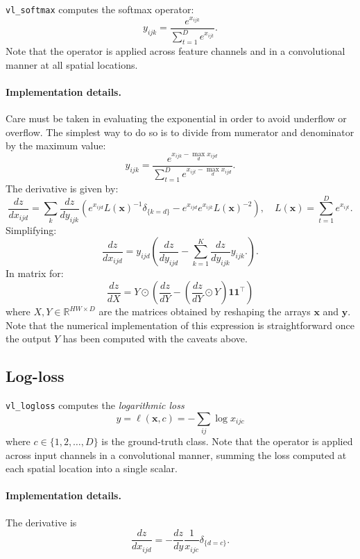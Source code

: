 \documentclass[12pt]{article}
\newcommand{\real}{\mathbb{R}}
\newcommand{\bx}{\mathbf{x}}
\newcommand{\by}{\mathbf{y}}
\newcommand{\bone}{\mathbf{1}}
\begin{document}
\verb!vl_softmax! computes the softmax operator:
\[
 y_{ijk} = \frac{e^{x_{ijk}}}{\sum_{t=1}^D e^{x_{ijt}}}.
\]
Note that the operator is applied across feature channels and in a convolutional manner at all spatial locations.

\paragraph{Implementation details.} Care must be taken in evaluating the exponential in order to avoid underflow or overflow. The simplest way to do so is to divide from numerator and denominator by the maximum value:
\[
 y_{ijk} = \frac{e^{x_{ijk} - \max_d x_{ijd}}}{\sum_{t=1}^D e^{x_{ijt}- \max_d x_{ijd}}}.
\]
The derivative is given by:
\[
\frac{dz}{d x_{ijd}}
=
\sum_{k}
\frac{dz}{d y_{ijk}}
\left(
e^{x_{ijd}} L(\bx)^{-1} \delta_{\{k=d\}}
-
e^{x_{ijd}}
e^{x_{ijk}} L(\bx)^{-2}
\right),
\quad
L(\bx) = \sum_{t=1}^D e^{x_{ijt}}.
\]
Simplifying:
\[
\frac{dz}{d x_{ijd}}
=
y_{ijd} 
\left(
\frac{dz}{d y_{ijd}}
-
\sum_{k=1}^K
\frac{dz}{d y_{ijk}} y_{ijk}.
\right).
\]
In matrix for:
\[
  \frac{dz}{dX} = Y \odot \left(\frac{dz}{dY} 
  - \left(\frac{dz}{dY} \odot Y\right) \bone\bone^\top\right)
\]
where $X,Y\in\real^{HW\times D}$ are the matrices obtained by reshaping the arrays
$\bx$ and $\by$. Note that the numerical implementation of this expression is straightforward once the output $Y$ has been computed with the caveats above.

\subsection{Log-loss}\label{s:loss}

\verb!vl_logloss! computes the \emph{logarithmic loss}
\[
 y = \ell(\bx,c) = - \sum_{ij} \log x_{ijc}
\]
where $c \in \{1,2,\dots,D\}$ is the ground-truth class. Note that the operator is applied across input channels in a convolutional manner, summing the loss computed at each spatial location into a single scalar. 

\paragraph{Implementation details.} The derivative is
\[
\frac{dz}{dx_{ijd}} = - \frac{dz}{dy} \frac{1}{x_{ijc}} \delta_{\{d = c\}}.
\]

\end{document}
